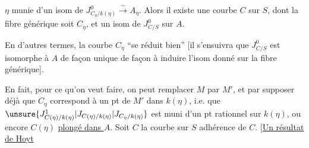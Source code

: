 
$\eta$ munie d'un isom  de $J^0_{C_\eta/k(\eta)}\xrightarrow{\sim}A_\eta$. Alors il existe une courbe $C$ sur $S$,  dont la fibre générique soit $C_\eta$, et un isom de $J^0_{C/S}$ sur $A$.

En d'autres termes, la courbe $C_\eta$ ``se réduit bien'' [il s'ensuivra que $J^0_{C/S}$ est  isomorphe à $A$ de façon unique de façon à induire l'isom donné sur la fibre générique].


 En fait, pour ce qu'on veut faire, on peut  remplacer $M$ par $M'$, et par  supposer déjà que $C_\eta$ correspond à un pt de $M'$ dans $k(\eta)$, i.e. que $\unsure{J^1_{C(\eta)/k(\eta)}|J_{C(\eta)/k(\eta)}|J_{C_\eta/k(\eta)}}$ est muni d'un pt rationnel sur $k(\eta)$, ou encore $C(\eta)$ \uline{plongé dans $A$}.  Soit $C$ la courbe sur $S$ adhérence de $C$. [\uline{Un résultat de Hoyt}

